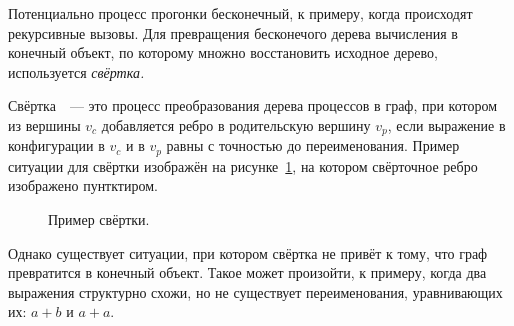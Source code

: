 Потенциально процесс прогонки бесконечный, к примеру, когда происходят рекурсивные вызовы.
Для превращения бесконечого дерева вычисления в конечный объект, по которому множно
восстановить исходное дерево, используется \emph{свёртка.}

Свёртка~~--- это процесс преобразования дерева процессов в граф, при котором
из вершины $v_c$ добавляется ребро в родительскую вершину $v_p$,
если выражение в конфигурации в $v_c$ и в $v_p$ равны с точностью до переименования.
Пример ситуации для свёртки изображён на рисунке~\ref{fig:pgraphFoldingExample},
на котором свёрточное ребро изображено пунтктиром.

\begin{figure}[h!]
\center
{}

\caption{Пример свёртки.}
\label{fig:pgraphFoldingExample}
\end{figure}

Однако существует ситуации, при котором свёртка не привёт к тому, что граф превратится в
конечный объект. Такое может произойти, к примеру, когда два выражения структурно
схожи, но не существует переименования, уравнивающих их: $a + b$ и $a + a$.

